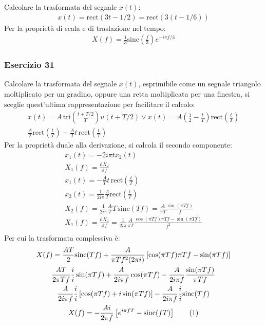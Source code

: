 \documentclass{article}
\newcommand{\rect}{\mathrm{rect}}
\newcommand{\sinc}{\mathrm{sinc}}
\newcommand{\tri}{\mathrm{tri}}
\newcommand{\df}{\mathrm{d}}
\newcommand{\tageq}{\tag{\stepcounter{equation}\theequation}}
\begin{document}
Calcolare la trasformata del segnale $x(t)$: 
\begin{gather*}
    x(t)=\rect(3t-1/2)=\rect(3(t-1/6))
\end{gather*}
Per la proprietà di scala e di traslazione nel tempo:
\begin{gather}
    X(f)=\displaystyle\frac{1}{3}\sinc\left(\frac{f}{3}\right)e^{-i\pi f/3}
\end{gather}

\subsubsection*{Esercizio 31}

Calcolare la trasformata del segnale $x(t)$, esprimibile come un segnale triangolo moltiplicato per un gradino, oppure una retta moltiplicata per una finestra, si sceglie 
quest'ultima rappresentazione per facilitare il calcolo:
\begin{gather*}
    x(t)=A\,\displaystyle\tri \left(\frac{t+T/2}{T}\right)u(t+T/2)\lor x(t)=A\left(\frac{1}{2}-\frac{t}{T}\right)\rect\left(\frac{t}{T}\right)\\
    \displaystyle\frac{A}{2}\rect\left(\frac{t}{T}\right)-\frac{A}{T}t\,\rect\left(\frac{t}{T}\right)
\end{gather*}
Per la proprietà duale alla derivazione, si calcola il secondo componente: 
\begin{gather*}
    x_1(t)=-2i\pi tx_2(t)\\
    X_1(f)=\displaystyle\frac{\df X_2}{\df f}\\
    x_1(t)=-\displaystyle\frac{A}{T}t\,\rect\left(\frac{t}{T}\right)\\
    x_2(t)=\displaystyle\frac{1}{2i\pi}\frac{A}{T}\rect\left(\frac{t}{T}\right)\\
    X_2(f)=\displaystyle\frac{1}{2i\pi}\frac{A}{T}T\,\sinc(Tf)=\frac{A}{\pi T}\frac{\sin(\pi Tf)}{f}\\
    X_1(f)=\displaystyle\frac{\df X_2}{\df f}=\frac{1}{2i\pi}\frac{A}{\pi T}\frac{\cos(\pi Tf)\pi Tf-\sin(\pi Tf)}{f^2}\\
\end{gather*}
Per cui la trasformata complessiva è:
\begin{gather*}
    X(f)=\displaystyle\frac{AT}{2}\sinc(Tf)+\frac{A}{\pi Tf^2(2\pi i)}\left[\cos(\pi Tf)\pi Tf-\sin (\pi Tf)\right]\\
    \displaystyle\frac{AT}{2\pi Tf}\frac{i}{i}\sin(\pi Tf)+\frac{A}{2i\pi f}\cos(\pi Tf)-\frac{A}{2i\pi f}\frac{\sin(\pi Tf)}{\pi Tf}\\
    \displaystyle\frac{A}{2i\pi f}\frac{i}{i}\left[\cos(\pi Tf)+i\sin(\pi Tf)\right]-\frac{A}{2i\pi f}\frac{i}{i}\sinc( Tf)\\
    X(f)=\displaystyle-\frac{Ai}{2\pi f}\left[e^{i\pi fT}-\sinc(fT)\right]\tageq
\end{gather*}
\end{document}
